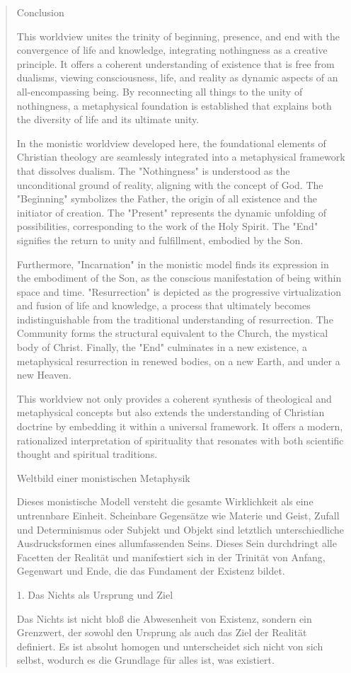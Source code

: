 \documentclass[
  ngerman,
]{article}
\begin{document}
\begin{quote}
Conclusion

This worldview unites the trinity of beginning, presence, and end with
the convergence of life and knowledge, integrating nothingness as a
creative principle. It offers a coherent understanding of existence that
is free from dualisms, viewing consciousness, life, and reality as
dynamic aspects of an all-encompassing being. By reconnecting all things
to the unity of nothingness, a metaphysical foundation is established
that explains both the diversity of life and its ultimate unity.

In the monistic worldview developed here, the foundational elements of
Christian theology are seamlessly integrated into a metaphysical
framework that dissolves dualism. The "Nothingness" is understood as the
unconditional ground of reality, aligning with the concept of God. The
"Beginning" symbolizes the Father, the origin of all existence and the
initiator of creation. The "Present" represents the dynamic unfolding of
possibilities, corresponding to the work of the Holy Spirit. The "End"
signifies the return to unity and fulfillment, embodied by the Son.

Furthermore, "Incarnation" in the monistic model finds its expression in
the embodiment of the Son, as the conscious manifestation of being
within space and time. "Resurrection" is depicted as the progressive
virtualization and fusion of life and knowledge, a process that
ultimately becomes indistinguishable from the traditional understanding
of resurrection. The Community forms the structural equivalent to the
Church, the mystical body of Christ. Finally, the "End" culminates in a
new existence, a metaphysical resurrection in renewed bodies, on a new
Earth, and under a new Heaven.

This worldview not only provides a coherent synthesis of theological and
metaphysical concepts but also extends the understanding of Christian
doctrine by embedding it within a universal framework. It offers a
modern, rationalized interpretation of spirituality that resonates with
both scientific thought and spiritual traditions.

Weltbild einer monistischen Metaphysik

Dieses monistische Modell versteht die gesamte Wirklichkeit als eine
untrennbare Einheit. Scheinbare Gegensätze wie Materie und Geist, Zufall
und Determinismus oder Subjekt und Objekt sind letztlich
unterschiedliche Ausdrucksformen eines allumfassenden Seins. Dieses Sein
durchdringt alle Facetten der Realität und manifestiert sich in der
Trinität von Anfang, Gegenwart und Ende, die das Fundament der Existenz
bildet.

1. Das Nichts als Ursprung und Ziel

Das Nichts ist nicht bloß die Abwesenheit von Existenz, sondern ein
Grenzwert, der sowohl den Ursprung als auch das Ziel der Realität
definiert. Es ist absolut homogen und unterscheidet sich nicht von sich
selbst, wodurch es die Grundlage für alles ist, was existiert.
\end{quote}
\end{document}
